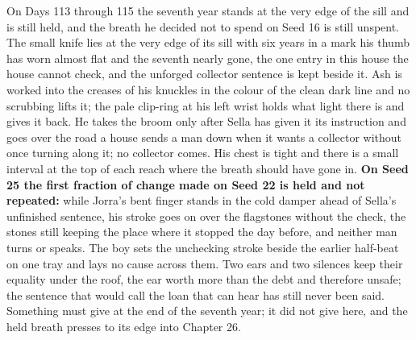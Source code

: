 \documentclass{design/chronicle}
\begin{document}
{On Days 113 through 115 the seventh year stands at the very edge of the sill and is still held, and the breath he decided not to spend on Seed 16 is still unspent. The small knife lies at the very edge of its sill with six years in a mark his thumb has worn almost flat and the seventh nearly gone, the one entry in this house the house cannot check, and the unforged collector sentence is kept beside it. Ash is worked into the creases of his knuckles in the colour of the clean dark line and no scrubbing lifts it; the pale clip-ring at his left wrist holds what light there is and gives it back. He takes the broom only after Sella has given it its instruction and goes over the road a house sends a man down when it wants a collector without once turning along it; no collector comes. His chest is tight and there is a small interval at the top of each reach where the breath should have gone in. \textbf{On Seed 25 the first fraction of change made on Seed 22 is held and not repeated:} while Jorra’s bent finger stands in the cold damper ahead of Sella’s unfinished sentence, his stroke goes on over the flagstones without the check, the stones still keeping the place where it stopped the day before, and neither man turns or speaks. The boy sets the unchecking stroke beside the earlier half-beat on one tray and lays no cause across them. Two ears and two silences keep their equality under the roof, the ear worth more than the debt and therefore unsafe; the sentence that would call the loan that can hear has still never been said. Something must give at the end of the seventh year; it did not give here, and the held breath presses to its edge into Chapter 26.

}
\end{document}
